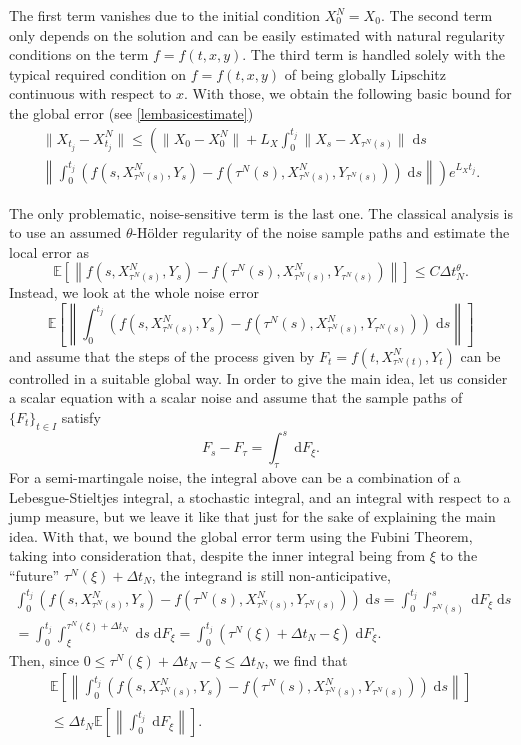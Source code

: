 \documentclass[reqno,12pt]{amsart}
\theoremstyle{plain} %
\theoremstyle{definition} %
\begin{document}
The first term vanishes due to the initial condition $X_0^N = X_0$. The second term only depends on the solution and can be easily estimated with natural regularity conditions on the term $f=f(t, x, y)$. The third term is handled solely with the typical required condition on $f=f(t, x, y)$ of being globally Lipschitz continuous with respect to $x$. With those, we obtain the following basic bound for the global error (see \cref{lembasicestimate})
\begin{multline}
    \label{Etjbasicboundintro}
        \|X_{t_j} - X_{t_j}^N\| \leq \left( \|X_0 - X_0^N\| + L_X \int_0^{t_j} \|X_s - X_{\tau^N(s)}\| \;\mathrm{d}s \right. \\
        \left. \left\|\int_0^{t_j} \left( f(s, X_{\tau^N(s)}^N, Y_s) - f(\tau^N(s), X_{\tau^N(s)}^N, Y_{\tau^N(s)}) \right)\;\mathrm{d}s\right\|\right) e^{L_X t_j}.
\end{multline}

The only problematic, noise-sensitive term is the last one. The classical analysis is to use an assumed $\theta$-H\"older regularity of the noise sample paths and estimate the local error as
\[
    \mathbb{E}\left[\left\|f(s, X_{\tau^N(s)}^N, Y_s) - f(\tau^N(s), X_{\tau^N(s)}^N, Y_{\tau^N(s)})\right\|\right] \leq C\Delta t_N^{\theta}.
\]
Instead, we look at the whole noise error 
\[
    \mathbb{E}\left[\left\|\int_0^{t_j} \left( f(s, X_{\tau^N(s)}^N, Y_s) - f(\tau^N(s), X_{\tau^N(s)}^N, Y_{\tau^N(s)}) \right)\;\mathrm{d}s\right\|\right]
\]
and assume that the steps of the process given by $F_t = f(t, X_{\tau^N(t)}^N, Y_t)$ can be controlled in a suitable global way. In order to give the main idea, let us consider a scalar equation with a scalar noise and assume that the sample paths of $\{F_t\}_{t\in I}$ satisfy
\[
    F_s - F_\tau = \int_\tau^s \;\mathrm{d}F_\xi.
\]
For a semi-martingale noise, the integral above can be a combination of a Lebesgue-Stieltjes integral, a stochastic integral, and an integral with respect to a jump measure, but we leave it like that just for the sake of explaining the main idea. With that, we bound the global error term using the Fubini Theorem, taking into consideration that, despite the inner integral being from $\xi$ to the ``future'' $\tau^N(\xi) + \Delta t_N$, the integrand is still non-anticipative, 
\begin{multline*}
    \int_0^{t_j} \left( f(s, X_{\tau^N(s)}^N, Y_s) - f(\tau^N(s), X_{\tau^N(s)}^N, Y_{\tau^N(s)}) \right)\;\mathrm{d}s = \int_0^{t_j} \int_{\tau^N(s)}^s \;\mathrm{d}  F_\xi\;\mathrm{d}s \\
    = \int_0^{t_j} \int_{\xi}^{\tau^N(\xi) + \Delta t_N} \;\mathrm{d}s \;\mathrm{d} F_\xi  = \int_0^{t_j} (\tau^N(\xi) + \Delta t_N - \xi) \;\mathrm{d} F_\xi.
\end{multline*}
Then, since $0 \leq \tau^N(\xi) + \Delta t_N - \xi \leq \Delta t_N$, we find that
\begin{multline*}
    \mathbb{E}\left[\left\| \int_0^{t_j} \left( f(s, X_{\tau^N(s)}^N, Y_s) - f(\tau^N(s), X_{\tau^N(s)}^N, Y_{\tau^N(s)}) \right)\;\mathrm{d}s\right\|\right] \\
    \leq \Delta t_N\mathbb{E}\left[\left\| \int_0^{t_j} \;\mathrm{d} F_\xi \right\|\right].
\end{multline*}
\end{document}
